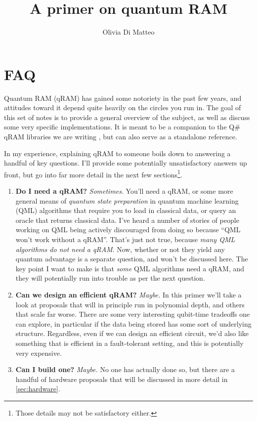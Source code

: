 \documentclass[a4paper,12pt]{article}
\title{A primer on quantum RAM}
\author{Olivia Di Matteo}
\begin{document}
\maketitle

\setcounter{tocdepth}{4}
\setcounter{secnumdepth}{4}
\tableofcontents

\section{FAQ}

Quantum RAM (qRAM) has gained some notoriety in the past few years, and attitudes toward it depend quite heavily on the circles you run in. 
The goal of this set of notes is to provide a general overview of the subject, as well as discuss some very specific implementations. 
It is meant to be a companion to the Q\# qRAM libraries we are writing \cite{OurLibrary}, but can also serve as a standalone reference.


In my experience, explaining qRAM to someone boils down to answering a handful of key questions. 
I'll provide some potentially unsatisfactory answers up front, but go into far more detail in the next few sections\footnote{Those details may not be satisfactory either.}.

\begin{enumerate} 
 \item \textbf{Do I need a qRAM?}
  \emph{Sometimes}. You'll need a qRAM, or some more general means of \emph{quantum state preparation} in quantum machine learning (QML) algorithms that require you to load in classical data, or query an oracle that returns classical data. 
  I've heard a number of stories of people working on QML being actively discouraged from doing so because ``QML won't work without a qRAM''. 
  That's just not true, because \emph{many QML algorithms do not need a qRAM}.
  Now, whether or not they yield any quantum advantage is a separate question, and won't be discussed here. 
  The key point I want to make is that \emph{some} QML algorithms need a qRAM, and they will potentially run into trouble as per the next question.
 \item \textbf{Can we design an efficient qRAM?} \emph{Maybe.} 
 In this primer we'll take a look at proposals that will in principle run in polynomial depth, and others that scale far worse. 
 There are some very interesting qubit-time tradeoffs one can explore, in particular if the data being stored has some sort of underlying structure. 
 Regardless, even if we can design an efficient circuit, we'd also like something that is efficient in a fault-tolerant setting, and this is potentially very expensive.
 \item \textbf{Can I build one?} \emph{Maybe.} No one has actually done so, but there are a handful of hardware proposals that will be discussed in more detail in \autoref{sec:hardware}. 
\end{enumerate}
\end{document}
